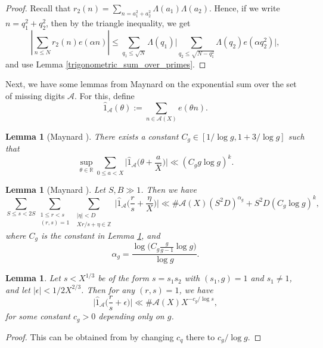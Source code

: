 \documentclass[12pt]{amsart}
\newtheorem{lem}[thm]{Lemma}
\theoremstyle{definition}
\theoremstyle{definition}
\theoremstyle{remark}
\numberwithin{equation}{section}
\newcommand{\Z}{\mathbb{Z}}
\newcommand{\R}{\mathbb{R}}
\newcommand{\CA}{\mathcal{A}}
\renewcommand{\leq}{\leqslant}
\renewcommand{\hat}{\widehat}
\begin{document}
\begin{proof}
Recall that $r_2(n)= \sum_{n=a_1^2+a_2^2} \Lambda(a_1)\Lambda(a_2)$. Hence, if we write $n=q_1^2+q_2^2$, then by the triangle inequality, we get
$$ \left|\sum_{n\leq N} r_2(n) e(\alpha n) \right| \leq \sum_{q_1\leq \sqrt{N}} \Lambda(q_1) \bigg| \sum_{q_2\leq  \sqrt{N-q_1^2}} \Lambda(q_2) e(\alpha q_2^2) \bigg|, $$
and use Lemma \ref{trigonometric_sum_over_primes}.
\end{proof}
Next, we have some lemmas from Maynard \cite{MR4452438} on the exponential sum over the set of missing digits $\CA$. For this, define
$$ \hat{1}_{\CA}(\theta) := \sum_{n\in \CA(X)} e(\theta n). $$
\begin{lem}[Maynard ]\label{L1_bound_for_fourier_transform}
There exists a constant $C_g \in [1/\log g,1+3/\log g]$ such that
$$ \sup_{\theta\in \R} \sum_{0\leq a < X} \bigg|\hat{1}_{\CA}\bigg(\theta + \frac{a}{X}\bigg)\bigg| \ll (C_g g \log g)^k. $$
\end{lem}

\begin{lem}[Maynard ]\label{hybrid_bound_for_fourier_transform}
Let $S,B\gg 1$. Then we have
$$ \sum_{S\leq s <2S} \sum_{\substack{1\leq r < s \\ (r,s)=1 }} \sum_{\substack{|\eta|< D \\ Xr/s+\eta \in \Z}} \bigg| \hat{1}_{\CA}\bigg( \frac{r}{s} + \frac{\eta}{X} \bigg)\bigg| \ll \#\CA(X) (S^2D)^{\alpha_g} + S^2D(C_g \log g)^k , $$
where $C_g$ is the constant in Lemma \ref{L1_bound_for_fourier_transform}, and
$$ \alpha_g = \frac{\log\big(C_g\frac{g}{g-1}\log g\big)}{\log g} .$$
\end{lem}

\begin{lem}\label{Linfty_bound_for_fourier_transform}
Let $s<X^{1/3}$ be of the form $s=s_1s_2$ with $(s_1,g)=1$ and $s_1\not=1$, and let $|\epsilon|<1/2X^{2/3}$. Then for any $(r,s)=1$, we have
$$ \bigg|\hat{1}_{\CA} \bigg( \frac{r}{s} +\epsilon \bigg)\bigg| \ll \#\CA(X) X^{- c_g /\log s} , $$
for some constant $c_g>0$ depending only on $g$.
\end{lem}
\begin{proof}
This can be obtained from \cite[Lemma 5.4]{MR4452438} by changing $c_q$ there to $c_g /\log g$.
\end{proof}
\end{document}
